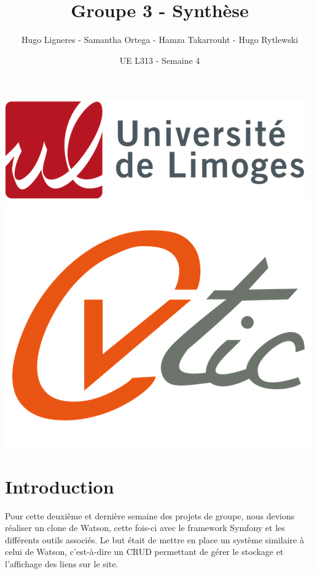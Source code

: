 \documentclass[12pt,a4paper]{article}
\title{Groupe 3 - Synthèse}
\author{Hugo Ligneres - Samantha Ortega - Hamza Takarrouht - Hugo Rytlewski}
\date{UE L313 - Semaine 4}
\begin{document}
\maketitle

\hrulefill
\vspace{6cm}
\begin{center}
	\includegraphics[scale=.4]{../images/univ.png}
		\\
		\vspace{2cm}
	\includegraphics[scale=.25]{../images/cvtic.png}
\end{center}

\newpage

\tableofcontents

\newpage

\section{Introduction}

Pour cette deuxième et dernière semaine des projets de groupe, nous devions réaliser un clone de Watson, cette fois-ci avec le framework Symfony et les différents outils associés. Le but était de mettre en place un système similaire à celui de Watson, c'est-à-dire un CRUD permettant de gérer le stockage et l'affichage des liens sur le site. \\
\end{document}
